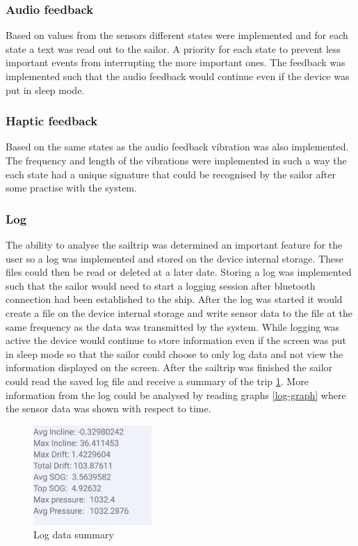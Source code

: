 \subsubsection{Audio feedback}
Based on values from the sensors different states were implemented and for each state a text was read out to the sailor. A priority for each state to prevent less important events from interrupting the more important ones. The feedback was implemented such that the audio feedback would continue even if the device was put in sleep mode.

\subsubsection{Haptic feedback}
Based on the same states as the audio feedback vibration was also implemented. The frequency and length of the vibrations were implemented in such a way the each state had a unique signature that could be recognised by the sailor after some practise with the system.

\subsubsection{Log}
The ability to analyse the sailtrip was determined an important feature for the user so a log was implemented and stored on the device internal storage. These files could then be read or deleted at a later date. Storing a log was implemented such that the sailor would need to start a logging session after bluetooth connection had been established to the ship. After the log was started it would create a file on the device internal storage and write sensor data to the file at the same frequency as the data was transmitted by the system. While logging was active the device would continue to store information even if the screen was put in sleep mode so that the sailor could choose to only log data and not view the information displayed on the screen. After the sailtrip was finished the sailor could read the saved log file and receive a summary of the trip \ref{log-summary}. More information from the log could be analysed by reading graphs \ref{log-graph} where the sensor data was shown with respect to time.

\begin{figure}[H]
\centering
\includegraphics[width=0.4\textwidth]{Figures/log_data.png}
\caption{Log data summary}
\label{log-summary}
\end{figure}

